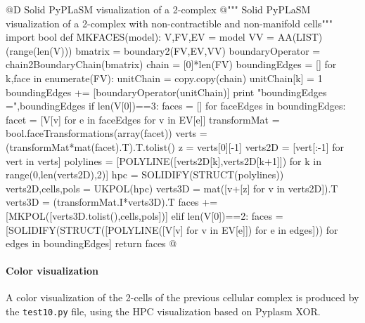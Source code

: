 \documentclass[11pt,oneside]{article}    %
\begin{document}
@D Solid PyPLaSM visualization of a 2-complex
@{""" Solid PyPLaSM visualization of a 2-complex with non-contractible 
      and non-manifold cells"""
import bool
def MKFACES(model):
    V,FV,EV = model
    VV = AA(LIST)(range(len(V)))
    bmatrix = boundary2(FV,EV,VV)
    boundaryOperator = chain2BoundaryChain(bmatrix)
    chain = [0]*len(FV)
    boundingEdges = []
    for k,face in enumerate(FV):
        unitChain = copy.copy(chain)
        unitChain[k] = 1
        boundingEdges += [boundaryOperator(unitChain)]
    print "boundingEdges =",boundingEdges
    if len(V[0])==3:
        faces = []
        for faceEdges in boundingEdges:
            facet = [V[v] for e in faceEdges for v in EV[e]]
            transformMat = bool.faceTransformations(array(facet))
            verts = (transformMat*mat(facet).T).T.tolist()
            z = verts[0][-1]
            verts2D = [vert[:-1] for vert in verts]
            polylines = [POLYLINE([verts2D[k],verts2D[k+1]]) for k in range(0,len(verts2D),2)]
            hpc = SOLIDIFY(STRUCT(polylines))
            verts2D,cells,pols = UKPOL(hpc)
            verts3D = mat([v+[z] for v in verts2D]).T
            verts3D = (transformMat.I*verts3D).T         
            faces += [MKPOL([verts3D.tolist(),cells,pols])]
    elif len(V[0])==2:
        faces = [SOLIDIFY(STRUCT([POLYLINE([V[v] for v in EV[e]]) for e in edges])) 
            for edges in boundingEdges]
    return faces
@}


\paragraph{Color visualization}
A color visualization of the 2-cells of the previous cellular complex is produced by the \texttt{test10.py} file, using the HPC visualization based on Pyplasm XOR.
\end{document}
